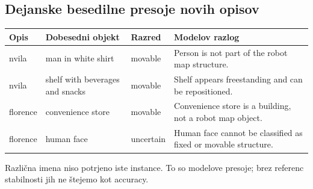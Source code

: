 \documentclass[10pt,a4paper]{article}
\begin{document}
\subsection*{Dejanske besedilne presoje novih opisov}\begin{center}\small\begin{tabular}{p{1.6cm}p{4.2cm}p{1.8cm}p{7.6cm}}\toprule
Opis & Dobesedni objekt & Razred & Modelov razlog \\ \midrule
nvila & man in white shirt & movable & Person is not part of the robot map structure. \\
nvila & shelf with beverages and snacks & movable & Shelf appears freestanding and can be repositioned. \\
florence & convenience store & movable & Convenience store is a building, not a robot map object. \\
florence & human face & uncertain & Human face cannot be classified as fixed or movable structure. \\
\bottomrule\end{tabular}\end{center}
Različna imena niso potrjeno iste instance. To so modelove presoje; brez referenc stabilnosti jih ne štejemo kot accuracy.

\newpage
\end{document}
